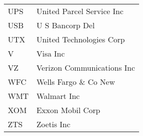 \begin{tabular}{ll}
UPS    &         United Parcel Service Inc \\
USB    &                   U S Bancorp Del \\
UTX    &          United Technologies Corp \\
V      &                          Visa Inc \\
VZ     &        Verizon Communications Inc \\
WFC    &             Wells Fargo \& Co New \\
WMT    &                       Walmart Inc \\
XOM    &                  Exxon Mobil Corp \\
ZTS    &                        Zoetis Inc \\
\bottomrule
\end{tabular}
